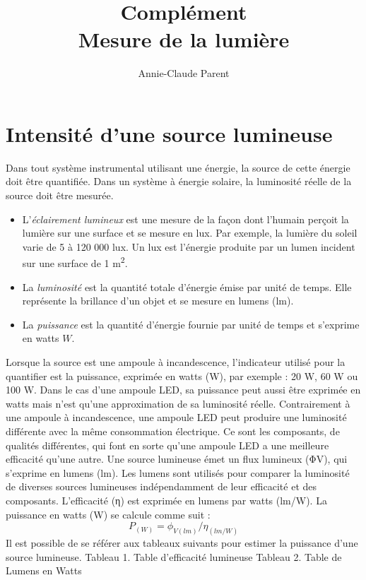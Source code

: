 \documentclass[12pt,oneside,letterpaper]{article}
\begin{document}
\title{\textbf{Complément}\\Mesure de la lumière}
\author{Annie-Claude Parent}
\date{}
\maketitle


\section{Intensité d'une source lumineuse}

Dans tout système instrumental utilisant une énergie, la source de cette énergie doit être quantifiée. Dans un système à énergie solaire, la luminosité réelle de la source doit être mesurée. 

\begin{itemize}
\item L'\textit{éclairement lumineux} est une mesure de la façon dont l'humain perçoit la lumière sur une surface et se mesure en lux. Par exemple, la lumière du soleil varie de 5 à 120 000 lux. Un lux est l'énergie produite par un lumen incident sur une surface de 1 m\textsuperscript{2}. 
\item La \textit{luminosité} est la quantité totale d'énergie émise par unité de temps. Elle représente la brillance d'un objet et se mesure en lumens (lm). 
\item La \textit{puissance} est la quantité d'énergie fournie par unité de temps et s'exprime en watts $W$. 
\end{itemize}

Lorsque la source est une ampoule à incandescence, l’indicateur utilisé pour la quantifier est la puissance, exprimée en watts (W), par exemple : 20 W, 60 W ou 100 W. Dans le cas d’une ampoule LED, sa puissance peut aussi être exprimée en watts mais n’est qu’une approximation de sa luminosité réelle. Contrairement à une ampoule à incandescence, une ampoule LED peut produire une luminosité différente avec la même consommation électrique. Ce sont les composants, de qualités différentes, qui font en sorte qu’une ampoule LED a une meilleure efficacité qu’une autre. 
Une source lumineuse émet un flux lumineux (ΦV), qui s’exprime en lumens (lm). Les lumens sont utilisés pour comparer la luminosité de diverses sources lumineuses indépendamment de leur efficacité et des composants. L'efficacité (η) est exprimée en lumens par watts (lm/W). La puissance en watts (W) se calcule comme suit : 
\begin{equation}
P_{(W)}=\phi_{V(lm)}/η_{(lm/W)}		
\end{equation}
Il est possible de se référer aux tableaux suivants pour estimer la puissance d’une source lumineuse. 
Tableau 1. Table d’efficacité lumineuse
Tableau 2. Table de Lumens en Watts
\end{document}
